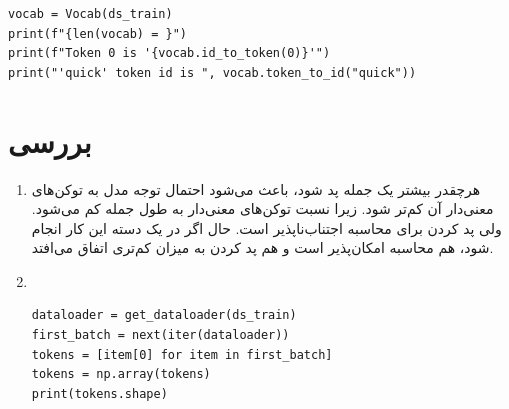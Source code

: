\begin{enumerate}
	\begin{program}[H]
		\begin{latin}
			\begin{verbatim}
vocab = Vocab(ds_train)
print(f"{len(vocab) = }")
print(f"Token 0 is '{vocab.id_to_token(0)}'")
print("'quick' token id is ", vocab.token_to_id("quick"))
			\end{verbatim}
			\label{q1:vocab}
		\end{latin}
		\caption{موارد خواسته‌شده بخش «د»}
	\end{program}
	
	
	\end{enumerate}
\section{بررسی }
\begin{enumerate}
	\item 
	هرچقدر بیشتر یک جمله پد شود، باعث می‌شود احتمال توجه مدل به توکن‌های معنی‌دار آن کم‌تر شود. زیرا نسبت توکن‌های معنی‌دار به طول جمله کم می‌شود. ولی پد کردن برای محاسبه اجتناب‌ناپذیر است. حال اگر در یک دسته 
	این کار انجام شود، هم محاسبه امکان‌پذیر است و هم پد کردن به میزان کم‌تری اتفاق می‌افتد.
	\item 
	~\\
		\begin{program}[H]
		\begin{latin}
			\begin{verbatim}
dataloader = get_dataloader(ds_train)
first_batch = next(iter(dataloader))
tokens = [item[0] for item in first_batch]
tokens = np.array(tokens)
print(tokens.shape)
			\end{verbatim}
			\label{q1:batch_shape}
		\end{latin}
		\caption{شکل بچ اول توکن‌ها}
	\end{program}
	
	
\end{enumerate}
